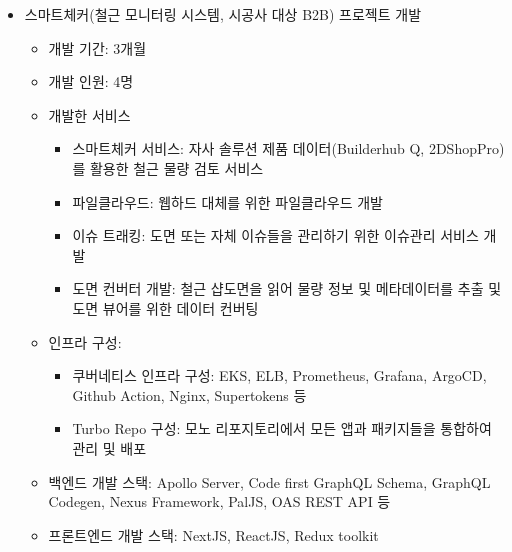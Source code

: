 \documentclass[10pt,a4paper,ragged2e]{altacv}
\begin{document}
\begin{fullwidth}
\begin{itemize}
		\item 스마트체커(철근 모니터링 시스템, 시공사 대상 B2B) 프로젝트 개발
		      \begin{itemize}[label=$\star$]
            \item 개발 기간: 3개월
            \item 개발 인원: 4명
			      \item 개발한 서비스
			            \begin{itemize}
				            \item 스마트체커 서비스: 자사 솔루션 제품 데이터(Builderhub Q, 2DShopPro)를 활용한 철근 물량 검토 서비스
				            \item 파일클라우드: 웹하드 대체를 위한 파일클라우드 개발
				            \item 이슈 트래킹: 도면 또는 자체 이슈들을 관리하기 위한 이슈관리 서비스 개발
				            \item 도면 컨버터 개발: 철근 샵도면을 읽어 물량 정보 및 메타데이터를 추출 및 도면 뷰어를 위한 데이터 컨버팅
			            \end{itemize}
			      \item 인프라 구성:
			            \begin{itemize}
				            \item 쿠버네티스 인프라 구성: EKS, ELB, Prometheus, Grafana, ArgoCD, Github Action, Nginx, Supertokens 등
				            \item Turbo Repo 구성: 모노 리포지토리에서 모든 앱과 패키지들을 통합하여 관리 및 배포
			            \end{itemize}
			      \item 백엔드 개발 스택: Apollo Server, Code first GraphQL Schema, GraphQL Codegen, Nexus Framework, PalJS, OAS REST API 등
			      \item 프론트엔드 개발 스택: NextJS, ReactJS, Redux toolkit
		      \end{itemize}

	\end{itemize}

	\divider


\end{fullwidth}
\end{document}
